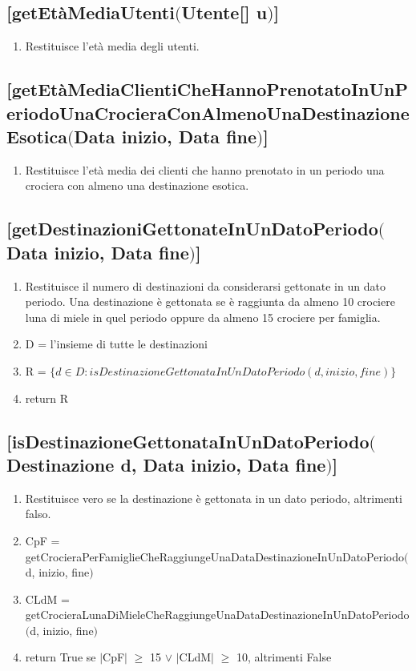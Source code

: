 \documentclass{article}
\begin{document}
\subsection*{[getEtàMediaUtenti$($Utente[] u$)$]}
\begin{enumerate}
    \item Restituisce l'età media degli utenti.
\end{enumerate}

\subsection*{[getEtàMediaClientiCheHannoPrenotatoInUnPeriodoUnaCrocieraConAlmenoUnaDestinazioneEsotica$($Data inizio, Data fine$)$]}
\begin{enumerate}
    \item Restituisce l'età media dei clienti che hanno prenotato in un periodo una crociera con almeno una destinazione esotica.
\end{enumerate}

\subsection*{[getDestinazioniGettonateInUnDatoPeriodo$($Data inizio, Data fine$)$]}
\begin{enumerate}
    \item Restituisce il numero di destinazioni da considerarsi gettonate in un dato periodo. Una destinazione è gettonata se è raggiunta da almeno 10 crociere luna di miele in quel periodo oppure da almeno 15 crociere per famiglia.
    \item D = l'insieme di tutte le destinazioni
    \item R = $\{d \in D: isDestinazioneGettonataInUnDatoPeriodo(d, inizio, fine)\}$
    \item return R
\end{enumerate}

\subsection*{[isDestinazioneGettonataInUnDatoPeriodo$($Destinazione d, Data inizio, Data fine$)$]}
\begin{enumerate}
    \item Restituisce vero se la destinazione è gettonata in un dato periodo, altrimenti falso.
    \item CpF = getCrocieraPerFamiglieCheRaggiungeUnaDataDestinazioneInUnDatoPeriodo$($d, inizio, fine$)$
    \item CLdM = getCrocieraLunaDiMieleCheRaggiungeUnaDataDestinazioneInUnDatoPeriodo$($d, inizio, fine$)$
    \item return True se $|$CpF$|$ $\geq$ 15 $\lor$ $|$CLdM$|$ $\geq$ 10, altrimenti False
\end{enumerate}
\end{document}
